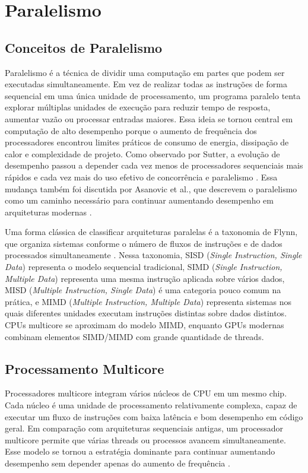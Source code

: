 \section{Paralelismo}
\subsection{Conceitos de Paralelismo}
Paralelismo é a técnica de dividir uma computação em partes que podem ser
executadas simultaneamente. Em vez de realizar todas as instruções de forma
sequencial em uma única unidade de processamento, um programa paralelo tenta
explorar múltiplas unidades de execução para reduzir tempo de resposta, aumentar
vazão ou processar entradas maiores. Essa ideia se tornou central em computação
de alto desempenho porque o aumento de frequência dos processadores encontrou
limites práticos de consumo de energia, dissipação de calor e complexidade de
projeto. Como observado por Sutter, a evolução de desempenho passou a depender
cada vez menos de processadores sequenciais mais rápidos e cada vez mais do uso
efetivo de concorrência e paralelismo \cite{sutterfree}. Essa mudança também foi
discutida por Asanovic et al., que descrevem o paralelismo como um caminho
necessário para continuar aumentando desempenho em arquiteturas modernas
\cite{asanoviclandscape}.

Uma forma clássica de classificar arquiteturas paralelas é a taxonomia de Flynn,
que organiza sistemas conforme o número de fluxos de instruções e de dados
processados simultaneamente \cite{flynntaxonomy}. Nessa taxonomia, SISD
(\textit{Single Instruction, Single Data}) representa o modelo sequencial
tradicional, SIMD (\textit{Single Instruction, Multiple Data}) representa uma
mesma instrução aplicada sobre vários dados, MISD (\textit{Multiple Instruction,
Single Data}) é uma categoria pouco comum na prática, e MIMD (\textit{Multiple
Instruction, Multiple Data}) representa sistemas nos quais diferentes unidades
executam instruções distintas sobre dados distintos. CPUs multicore se aproximam
do modelo MIMD, enquanto GPUs modernas combinam elementos SIMD/MIMD com grande
quantidade de threads.

\subsection{Processamento Multicore}

Processadores multicore integram vários núcleos de CPU em um mesmo chip. Cada
núcleo é uma unidade de processamento relativamente complexa, capaz de executar
um fluxo de instruções com baixa latência e bom desempenho em código geral. Em
comparação com arquiteturas sequenciais antigas, um processador multicore permite
que várias threads ou processos avancem simultaneamente. Esse modelo se tornou a
estratégia dominante para continuar aumentando desempenho sem depender apenas do
aumento de frequência \cite{hennessypatterson}.

